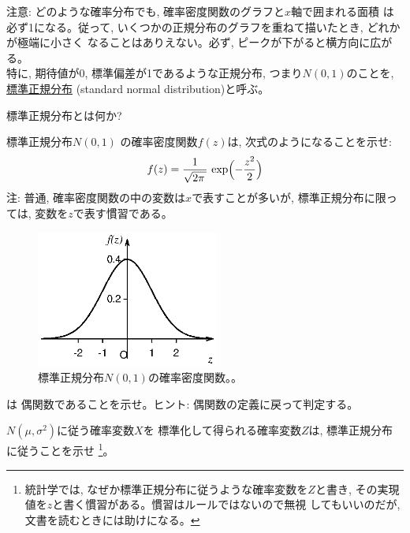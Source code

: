 注意: どのような確率分布でも, 確率密度関数のグラフと$x$軸で囲まれる面積
は必ず1になる。従って, いくつかの正規分布のグラフを重ねて描いたとき, どれかが極端に小さく
なることはありえない。必ず, ピークが下がると横方向に広がる。\\

特に, 期待値が0, 標準偏差が1であるような正規分布, つまり$N(0, 1)$のことを, 
\underline{標準正規分布} (standard normal distribution)と呼ぶ。

\begin{q}\label{q:stat_stdnormal_def} 標準正規分布とは何か?\end{q}
\mv

\begin{q}\label{q:stat_std_normal_dist_f} 標準正規分布$N(0, 1)$
の確率密度関数$f(z)$は, 次式のようになることを示せ:
\begin{eqnarray}
f(z)=\frac{1}{\sqrt{2\pi\,}}\,\exp\Bigl(-\frac{z^2}{2}\Bigr)\label{eq:StdNormalDist}
\end{eqnarray}
注: 普通, 確率密度関数の中の変数は$x$で表すことが多いが, 
標準正規分布に限っては, 変数を$z$で表す慣習である。
\end{q}\vspace{0.3cm}

\begin{figure}[h]
    \centering
    \includegraphics[width=6cm]{normal_dist.eps}
    \caption{標準正規分布$N(0, 1)$の確率密度関数。。}
\end{figure}
\mv

\begin{q}\label{q:stat_std_normal_dist_f_sym} は
偶関数であることを示せ。ヒント: 偶関数の定義に戻って判定する。\end{q}\vspace{0.3cm}

\begin{q}\label{q:stat_normal2std} $N(\mu,\sigma^2)$に従う確率変数$X$を
標準化して得られる確率変数$Z$は, 標準正規分布に従うことを示せ
\footnote{統計学では, なぜか標準正規分布に従うような確率変数を$Z$と書き, 
その実現値を$z$と書く慣習がある。慣習はルールではないので無視
してもいいのだが, 文書を読むときには助けになる。}。\end{q}
\mv

